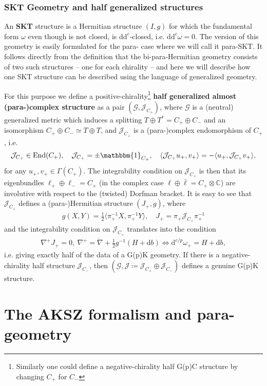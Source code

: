 \documentclass[letterpaper,12pt]{article}
\newcommand{\TT}{{T\oplus T^*}}
\newcommand{\JJ}{\mathcal{J}}
\newcommand{\GG}{\mathcal{G}}
\newcommand{\id}{\mathbbm{1}}
\newcommand{\lc}{\mathring{\n}}
\newcommand{\n}{\nabla}
\newcommand{\rd}{\mathrm{d}}
\newcommand{\se}{\Gamma}
\newcommand{\la}{\langle}
\newcommand{\ra}{\rangle}
\theoremstyle{definition}
\theoremstyle{remark}
\theoremstyle{examples}
\DeclareMathOperator{\End}{End}
\begin{document}
\subsubsection{SKT Geometry and half generalized structures} \label{SKT}

An {\bf SKT} structure is a Hermitian structure $(I,g)$ for which the fundamental form $\omega$ even though is not closed, is $\rd \rd^c$-closed, i.e. $\rd \rd^c \omega=0$. The version of this geometry is easily formulated for the para- case where we will call it para-SKT. It follows directly from the definition that the bi-para-Hermitian geometry consists of two such structures -- one for each chirality -- and here we will describe how one SKT structure can be described using the language of generalized geometry.

For this purpose we define a positive-chirality\footnote{Similarly one could define a negative-chirality half G(p)C structure by changing $C_+$ for $C_-$} {\bf half generalized almost (para-)complex structure} as a pair $(\GG,\JJ_{C_+})$, where $\GG$ is a (neutral) generalized metric which induces a splitting $\TT=C_+\oplus C_-$ and an isomorphism $C_+\oplus C_-\simeq T\oplus T$, and $\JJ_{C_+}$ is a (para-)complex endomorphism of $C_+$, i.e.
\begin{align*}
\JJ_{C_+}\in \End(C_+),\quad \JJ_{C_+}=\pm \id_{C_+},\quad \la \JJ_{C_+} u_+,v_+\ra=-\la u_+,\JJ_{C_+} v_+\ra,
\end{align*}
for any $u_+,v_+ \in \se(C_+)$. The integrability condition on $\JJ_{C_+}$ is then that its eigenbundles $\ell_+\oplus \ell_-=C_+$ (in the complex case $\ell\oplus \bar{\ell}=C_+\otimes \mathbb{C}$) are involutive with respect to the (twisted) Dorfman bracket. It is easy to see that $\JJ_{C_+}$ defines a (para-)Hermitian structure $(J_+,g)$, where
\begin{align*}
g(X,Y)=\frac{1}{2}\la \pi_+^{-1}X,\pi_+^{-1}Y\ra,\quad J_+=\pi_+\JJ_{C_+}\pi^{-1}_+
\end{align*}
and the integrability condition on $\JJ_{C_+}$ translates into the condition
\begin{align*}
\n^+J_+=0,\ \n^+=\lc+\frac{1}{2}g^{-1}(H+\rd b) \Longleftrightarrow \rd^{c/p}\omega_+=H+\rd b,
\end{align*}
i.e. giving exactly half of the data of a G(p)K geometry. If there is a negative-chirality half structure $\JJ_{C_-}$, then $(\GG,\JJ\coloneqq \JJ_{C_+}\oplus \JJ_{C_-})$ defines a genuine G(p)K structure.

\section{The AKSZ formalism and para-geometry} \label{sec: AKSZ}
\end{document}
